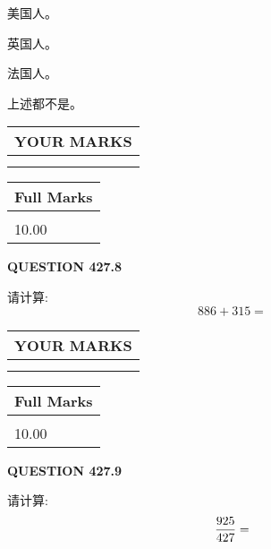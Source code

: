 \documentclass{ctexart}
\begin{document}
 
美国人。
 
 
英国人。
 
 
法国人。
 
 
 上述都不是。
 
 
  
\vspace{0.2in}
  
\noindent\begin{tabular}{|l|}
\hline
 YOUR MARKS  \\
\hline
 \\ 
 \\ 
\hline
\end{tabular}
\hspace{0.05in} \begin{tabular}{|l|}
\hline
 Full Marks  \\
\hline
 \\ 
10.00 \\
\hline
\end{tabular}
{\textbf{\Large{QUESTION
427.8 
}}}
  
  
 
请计算:
\begin{equation}
886 +  %
315 = \nonumber
\end{equation}
 

 

 
  
\vspace{0.2in}
  
\noindent\begin{tabular}{|l|}
\hline
 YOUR MARKS  \\
\hline
 \\ 
 \\ 
\hline
\end{tabular}
\hspace{0.05in} \begin{tabular}{|l|}
\hline
 Full Marks  \\
\hline
 \\ 
10.00 \\
\hline
\end{tabular}
{\textbf{\Large{QUESTION
427.9 
}}}
  
  
 
请计算:
\begin{equation}
\frac { %
925 }  {  %
427} = \nonumber
\end{equation}
 
\end{document}
